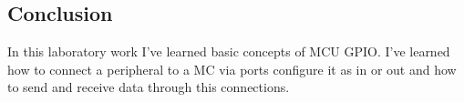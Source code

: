 \subsection*{Conclusion}
In this laboratory work I've learned basic concepts of MCU GPIO.
I've learned how to connect a peripheral to a MC via ports configure it as in or out and how to send and receive data through this connections.



